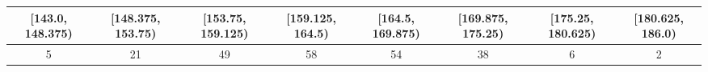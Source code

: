 \begin{tabular}{|c|c|c|c|c|c|c|c|}
    \hline
    \rule{0pt}{4ex} [143.0, 148.375) & [148.375, 153.75) & [153.75, 159.125) & [159.125, 164.5) & [164.5, 169.875) & [169.875, 175.25) & [175.25, 180.625) & [180.625, 186.0)\\
    \hline
    5 & 21 & 49 & 58 & 54 & 38 & 6 & 2\\
    \hline
    [1ex]
\end{tabular}